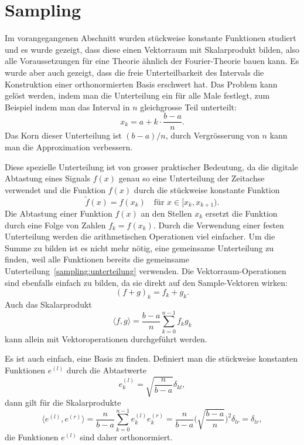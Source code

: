 %
%
%
\section{Sampling%
\label{section:sampling}}
Im vorangegangenen Abschnitt wurden stückweise konstante Funktionen studiert
und es wurde gezeigt, dass diese einen Vektorraum mit Skalarprodukt bilden,
also alle Voraussetzungen für eine Theorie ähnlich der Fourier-Theorie
bauen kann.
Es wurde aber auch gezeigt, dass die freie Unterteilbarkeit des Intervals
die Konstruktion einer orthonormierten Basis erschwert hat.
Das Problem kann gelöst werden, indem man die Unterteilung ein für alle
Male festlegt, zum Beispiel indem man das Interval in $n$ gleichgrosse
Teil unterteilt:
\begin{equation}
x_k = a + k\cdot\frac{b-a}{n}.
\label{sampling:unterteilung}
\end{equation}
Das Korn dieser Unterteilung ist $(b-a)/n$, durch Vergrösserung von $n$
kann man die Approximation verbessern.

Diese spezielle Unterteilung ist von grosser praktischer Bedeutung,
da die digitale Abtastung eines Signals $f(x)$ genau so eine Unterteilung
der Zeitachse verwendet und die Funktion $f(x)$ durch die stückweise
konstante Funktion
\[
\tilde{f} (x) = f(x_k)\quad\text{für $x\in[x_k,x_{k+1})$}.
\]
Die Abtastung einer Funktion $f(x)$ an den Stellen $x_k$ ersetzt
die Funktion durch eine Folge von Zahlen $f_k = f(x_k)$.
Durch die Verwendung einer festen Unterteilung werden die arithmetischen
Operationen viel einfacher.
Um die Summe zu bilden ist es nicht mehr nötig, eine gemeinsame
Unterteilung zu finden, weil alle Funktionen bereits die gemeinsame
Unterteilung~\eqref{sampling:unterteilung} verwenden.
Die Vektorraum-Operationen sind ebenfalls einfach zu bilden,
da sie direkt auf den Sample-Vektoren wirken:
\[
(f+g)_k = f_k + g_k.
\]
Auch das Skalarprodukt 
\[
\langle f,g\rangle
=
\frac{b-a}{n}
\sum_{k=0}^{n-1} f_k g_k
\]
kann allein mit Vektoroperationen durchgeführt werden.

Es ist auch einfach, eine Basis zu finden.
Definiert man die stückweise konstanten Funktionen $e^{(l)}$
durch die Abtastwerte
\[
e_k^{(l)} = \sqrt{\frac{n}{b-a}}\delta_{kl},
\]
dann gilt für die Skalarprodukte
\[
\langle e^{(l)}, e^{(r)}\rangle
=
\frac{n}{b-a}
\sum_{k=0}^{n-1} e^{(l)}_k e^{(r)}_k
=
\frac{n}{b-a}
\biggl(\sqrt{\frac{b-a}{n}}\biggr)^2 \delta_{lr}
=
\delta_{lr},
\]
die Funktionen $e^{(l)}$ sind daher orthonormiert.

